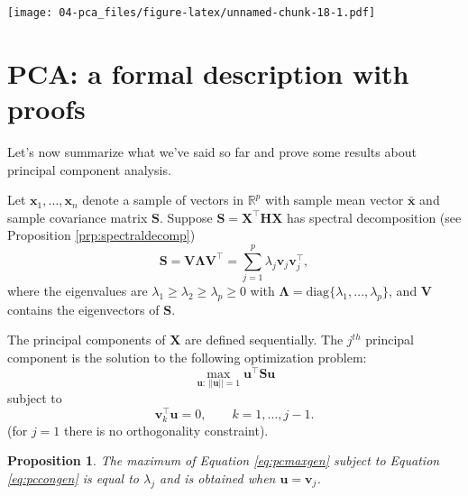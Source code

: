 \documentclass[]{book}
\newtheorem{proposition}{Proposition}[chapter]
\theoremstyle{definition}
\theoremstyle{definition}
\theoremstyle{definition}
\theoremstyle{remark}
\begin{document}
\texttt{[image: 04-pca\_files/figure-latex/unnamed-chunk-18-1.pdf]}

\hypertarget{pca-a-formal-description-with-proofs}{%
\section{PCA: a formal description with proofs}\label{pca-a-formal-description-with-proofs}}

Let's now summarize what we've said so far and prove some results about principal component analysis.

Let \(\mathbf x_1, \ldots , \mathbf x_n\) denote a sample of vectors in \(\mathbb{R}^p\) with sample mean vector \(\bar{\mathbf x}\) and sample covariance matrix \(\mathbf S\). Suppose \(\mathbf S=\mathbf X^\top \mathbf H\mathbf X\) has spectral decomposition (see Proposition \ref{prp:spectraldecomp})
\begin{equation}
\mathbf S=\mathbf V\boldsymbol \Lambda\mathbf V^\top = \sum_{j=1}^p  \lambda_j \mathbf v_j \mathbf v_j^\top,
\label{eq:pcaspect}
\end{equation}
where the eigenvalues are \(\lambda_1 \geq \lambda_2 \geq \lambda_p \geq 0\) with \(\boldsymbol \Lambda=\text{diag}\{\lambda_1, \ldots, \lambda_p\}\), and \(\mathbf V\) contains the eigenvectors of \(\mathbf S\).

The principal components of \(\mathbf X\) are defined sequentially. The \(j^{th}\) principal component is the solution to the following optimization problem:
\begin{equation}
\max_{\mathbf u: \, \vert \vert \mathbf u\vert \vert =1}\mathbf u^\top \mathbf S\mathbf u
\label{eq:pcmaxgen}
\end{equation}
subject to
\begin{equation}
\mathbf v_k^\top \mathbf u=0, \qquad k=1, \ldots , j-1.
\label{eq:pccongen}
\end{equation}
(for \(j=1\) there is no orthogonality constraint).

\begin{proposition}
\protect\hypertarget{prp:pca1}{}{\label{prp:pca1} }The maximum of Equation \eqref{eq:pcmaxgen}
subject to Equation \eqref{eq:pccongen} is equal to \(\lambda_j\) and is obtained when \(\mathbf u=\mathbf v_j\).
\end{proposition}
\end{document}
